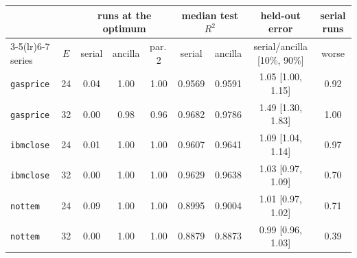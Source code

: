 \begin{tabular}{lcccccccc}\toprule
 & & \multicolumn{3}{c}{runs at the optimum} & \multicolumn{2}{c}{median test $R^2$} & held-out error & serial runs \\
\cmidrule(lr){3-5}\cmidrule(lr){6-7}
series & $E$ & serial & ancilla & par.\,2 & serial & ancilla & serial/ancilla [10\%, 90\%] & worse \\\midrule
\texttt{gasprice} & 24 & 0.04 & 1.00 & 1.00 & 0.9569 & 0.9591 & 1.05 [1.00, 1.15] & 0.92 \\
\texttt{gasprice} & 32 & 0.00 & 0.98 & 0.96 & 0.9682 & 0.9786 & 1.49 [1.30, 1.83] & 1.00 \\
\texttt{ibmclose} & 24 & 0.01 & 1.00 & 1.00 & 0.9607 & 0.9641 & 1.09 [1.04, 1.14] & 0.97 \\
\texttt{ibmclose} & 32 & 0.00 & 1.00 & 1.00 & 0.9629 & 0.9638 & 1.03 [0.97, 1.09] & 0.70 \\
\texttt{nottem} & 24 & 0.09 & 1.00 & 1.00 & 0.8995 & 0.9004 & 1.01 [0.97, 1.02] & 0.71 \\
\texttt{nottem} & 32 & 0.00 & 1.00 & 1.00 & 0.8879 & 0.8873 & 0.99 [0.96, 1.03] & 0.39 \\
\bottomrule
\end{tabular}
